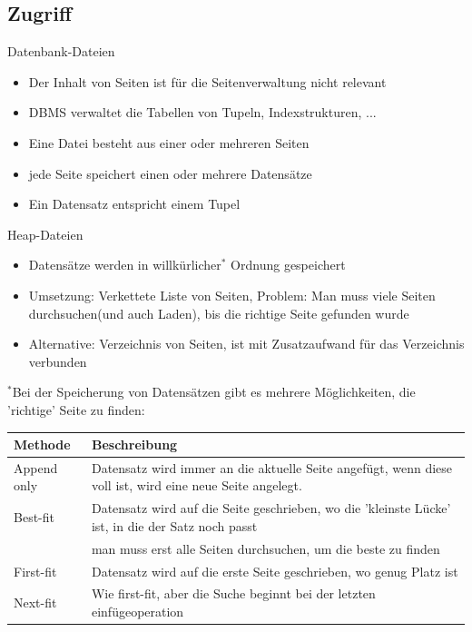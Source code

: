 \documentclass{article}
\begin{document}
\subsection*{Zugriff}
\begin{block}{Datenbank-Dateien}
  \begin{itemize}
    \item Der Inhalt von Seiten ist für die Seitenverwaltung nicht relevant
    \item DBMS verwaltet die Tabellen von Tupeln, Indexstrukturen, ...
    \item Eine Datei besteht aus einer oder mehreren Seiten
    \item jede Seite speichert einen oder mehrere Datensätze
    \item Ein Datensatz entspricht einem Tupel
  \end{itemize}
\end{block}

\begin{block}{Heap-Dateien}
  \begin{itemize}
    \item Datensätze werden in willkürlicher$^*$ Ordnung gespeichert
    \item Umsetzung: Verkettete Liste von Seiten, Problem: Man muss viele Seiten durchsuchen(und auch Laden), bis die richtige Seite gefunden wurde
    \item Alternative: Verzeichnis von Seiten, ist mit Zusatzaufwand für das Verzeichnis verbunden
  \end{itemize}
  $^*$Bei der Speicherung von Datensätzen gibt es mehrere Möglichkeiten, die 'richtige' Seite zu finden:
  \begin{tabular}{|p{4cm}|p{6.5cm}|}
    \hline
    \textbf{Methode} & \textbf{Beschreibung} \\
    \hline
    Append only & Datensatz wird immer an die aktuelle Seite angefügt, wenn diese voll ist, wird eine neue Seite angelegt. \\
    \hline
    Best-fit & Datensatz wird auf die Seite geschrieben, wo die 'kleinste Lücke' ist, in die der Satz noch passt \\
    & man muss erst alle Seiten durchsuchen, um die beste zu finden \\
    \hline
    First-fit & Datensatz wird auf die erste Seite geschrieben, wo genug Platz ist \\
    \hline
    Next-fit & Wie first-fit, aber die Suche beginnt bei der letzten einfügeoperation \\
    \hline
  \end{tabular}
\end{block}
\end{document}
